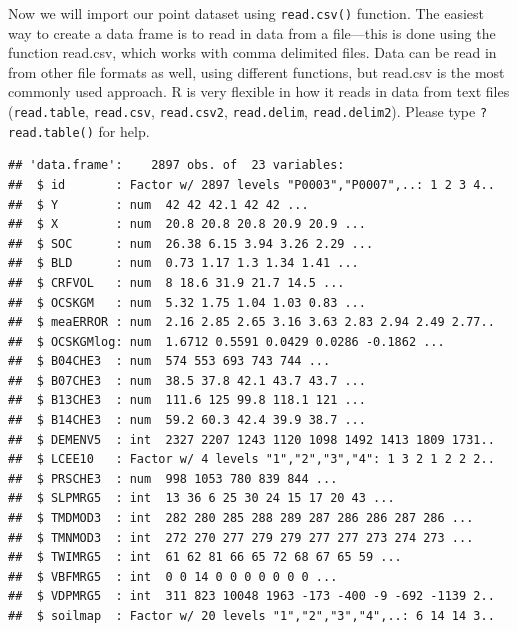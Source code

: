 \documentclass[10pt,b5paper,]{book}
\newenvironment{Shaded}{\begin{snugshade}}{\end{snugshade}}
\newcommand{\CommentTok}[1]{\textcolor[rgb]{0.56,0.35,0.01}{\textit{#1}}}
\newcommand{\KeywordTok}[1]{\textcolor[rgb]{0.13,0.29,0.53}{\textbf{#1}}}
\newcommand{\NormalTok}[1]{#1}
\newcommand{\OperatorTok}[1]{\textcolor[rgb]{0.81,0.36,0.00}{\textbf{#1}}}
\newcommand{\StringTok}[1]{\textcolor[rgb]{0.31,0.60,0.02}{#1}}
\theoremstyle{definition}
\theoremstyle{definition}
\theoremstyle{definition}
\theoremstyle{remark}
\begin{document}
Now we will import our point dataset using \texttt{read.csv()} function.
The easiest way to create a data frame is to read in data from a
file---this is done using the function read.csv, which works with comma
delimited files. Data can be read in from other file formats as well,
using different functions, but read.csv is the most commonly used
approach. R is very flexible in how it reads in data from text files
(\texttt{read.table}, \texttt{read.csv}, \texttt{read.csv2},
\texttt{read.delim}, \texttt{read.delim2}). Please type
\texttt{?read.table()} for help.

\begin{Shaded}
\end{Shaded}

\begin{verbatim}
## 'data.frame':    2897 obs. of  23 variables:
##  $ id       : Factor w/ 2897 levels "P0003","P0007",..: 1 2 3 4..
##  $ Y        : num  42 42 42.1 42 42 ...
##  $ X        : num  20.8 20.8 20.8 20.9 20.9 ...
##  $ SOC      : num  26.38 6.15 3.94 3.26 2.29 ...
##  $ BLD      : num  0.73 1.17 1.3 1.34 1.41 ...
##  $ CRFVOL   : num  8 18.6 31.9 21.7 14.5 ...
##  $ OCSKGM   : num  5.32 1.75 1.04 1.03 0.83 ...
##  $ meaERROR : num  2.16 2.85 2.65 3.16 3.63 2.83 2.94 2.49 2.77..
##  $ OCSKGMlog: num  1.6712 0.5591 0.0429 0.0286 -0.1862 ...
##  $ B04CHE3  : num  574 553 693 743 744 ...
##  $ B07CHE3  : num  38.5 37.8 42.1 43.7 43.7 ...
##  $ B13CHE3  : num  111.6 125 99.8 118.1 121 ...
##  $ B14CHE3  : num  59.2 60.3 42.4 39.9 38.7 ...
##  $ DEMENV5  : int  2327 2207 1243 1120 1098 1492 1413 1809 1731..
##  $ LCEE10   : Factor w/ 4 levels "1","2","3","4": 1 3 2 1 2 2 2..
##  $ PRSCHE3  : num  998 1053 780 839 844 ...
##  $ SLPMRG5  : int  13 36 6 25 30 24 15 17 20 43 ...
##  $ TMDMOD3  : int  282 280 285 288 289 287 286 286 287 286 ...
##  $ TMNMOD3  : int  272 270 277 279 279 277 277 273 274 273 ...
##  $ TWIMRG5  : int  61 62 81 66 65 72 68 67 65 59 ...
##  $ VBFMRG5  : int  0 0 14 0 0 0 0 0 0 0 ...
##  $ VDPMRG5  : int  311 823 10048 1963 -173 -400 -9 -692 -1139 2..
##  $ soilmap  : Factor w/ 20 levels "1","2","3","4",..: 6 14 14 3..
\end{verbatim}
\end{document}

